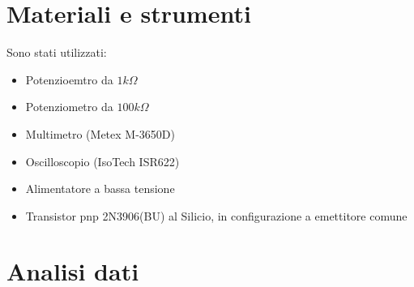 \documentclass{article}
\begin{document}
\section{Materiali e strumenti}
Sono stati utilizzati:
\begin{itemize}
    \item Potenzioemtro da $1 k\Omega$
    \item Potenziometro da $100 k\Omega$
    \item Multimetro (Metex M-3650D)
    \item Oscilloscopio (IsoTech ISR622)
    \item Alimentatore a bassa tensione
    \item Transistor pnp 2N3906(BU) al Silicio, in configurazione a emettitore comune
\end{itemize}



\section{Analisi dati}
\end{document}
